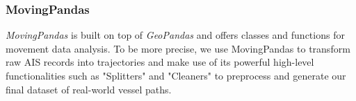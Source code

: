 \subsubsection{MovingPandas}\label{subchap:movingPandas}
\textit{MovingPandas} \cite[]{graser2019movingpandas} is built on top of \textit{GeoPandas} \cite[]{kelsey_jordahl_2020_3946761} and offers classes and functions for movement data analysis. To be more precise, we use MovingPandas to transform raw AIS records into trajectories and make use of its powerful high-level functionalities such as "Splitters" and "Cleaners" to preprocess and generate our final dataset of real-world vessel paths.